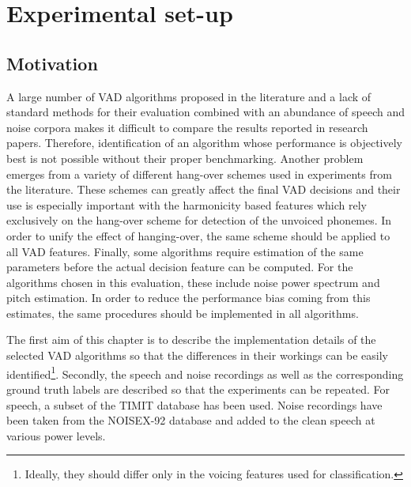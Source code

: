 
\chapter{Experimental set-up} %

\label{Chapter3} %



\section{Motivation}

A large number of VAD algorithms proposed in the literature and a lack of standard methods for their evaluation combined with an abundance of speech and noise corpora makes it difficult to compare the results reported in research papers. Therefore, identification of an algorithm whose performance is objectively best is not possible without their proper benchmarking. Another problem emerges from a variety of different hang-over schemes used in experiments from the literature. These schemes can greatly affect the final VAD decisions and their use is especially important with the harmonicity based features which rely exclusively on the hang-over scheme for detection of the unvoiced phonemes. In order to unify the effect of hanging-over, the same scheme should be applied to all VAD features. Finally, some algorithms require estimation of the same parameters before the actual decision feature can be computed. For the algorithms chosen in this evaluation, these include noise power spectrum and pitch estimation. In order to reduce the performance bias coming from this estimates, the same procedures should be implemented in all algorithms.

The first aim of this chapter is to describe the implementation details of the selected VAD algorithms so that the differences in their workings can be easily identified\footnote{Ideally, they should differ only in the voicing features used for classification.}. Secondly, the speech and noise recordings as well as the corresponding ground truth labels are described so that the experiments can be repeated. For speech, a subset of the TIMIT \cite{TIMIT} database has been used. Noise recordings have been taken from the NOISEX-92 \cite{NOISEX} database and added to the clean speech at various power levels.


